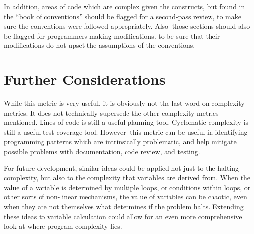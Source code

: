 In addition, areas of code which are complex given the constructs, but found in the ``book of conventions'' should be flagged for a second-pass review, to make sure the conventions were followed appropriately.  Also, those sections should also be flagged for programmers making modifications, to be sure that their modifications do not upset the assumptions of the conventions.

\section{Further Considerations}

While this metric is very useful, it is obviously not the last word on complexity metrics.  It does not technically supersede the other complexity metrics mentioned.  Lines of code is still a useful planning tool.  Cyclomatic complexity is still a useful test coverage tool.  However, this metric can be useful in identifying programming patterns which are intrinsically problematic, and help mitigate possible problems with documentation, code review, and testing.  

For future development, similar ideas could be applied not just to the halting complexity, but also to the complexity that variables are derived from.  When the value of a variable is determined by multiple loops, or conditions within loops, or other sorts of non-linear mechanisms, the value of variables can be chaotic, even when they are not themselves what determines if the problem halts.  Extending these ideas to variable calculation could allow for an even more comprehensive look at where program complexity lies.





